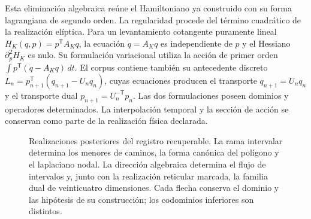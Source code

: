 \documentclass[a4paper,10pt]{article}
\theoremstyle{definition}\newtheorem{definition}[theorem]{Definición}
\theoremstyle{remark}\newtheorem{remark}[theorem]{Observación}
\numberwithin{equation}{section}
\begin{document}
Esta eliminación algebraica reúne el Hamiltoniano ya construido con
su forma lagrangiana de segundo orden. La regularidad procede del
término cuadrático de la realización elíptica. Para un levantamiento
cotangente puramente lineal \(H_K(q,p)=p^{\mathsf T}A_Kq\), la
ecuación \(\dot q=A_Kq\) es independiente de \(p\) y el Hessiano
\(\partial_p^2H_K\) es nulo. Su formulación variacional utiliza la
acción de primer orden \(\int p^{\mathsf T}(\dot q-A_Kq)\,dt\).
El corpus contiene también su antecedente discreto
\(L_n=p_{n+1}^{\mathsf T}(q_{n+1}-U_nq_n)\), cuyas ecuaciones
producen el transporte \(q_{n+1}=U_nq_n\) y el transporte dual
\(p_{n+1}=U_n^{-\mathsf T}p_n\). Las dos formulaciones poseen
dominios y operadores determinados. La interpolación temporal y la
sección de acción se conservan como parte de la realización física
declarada.

\begin{figure}[htbp]
\centering
{}
\caption{Realizaciones posteriores del registro recuperable. La rama
intervalar determina los menores de caminos, la forma canónica del
polígono y el laplaciano nodal. La dirección algebraica determina el
flujo de intervalos y, junto con la realización reticular marcada, la
familia dual de veinticuatro dimensiones. Cada flecha conserva el dominio
y las hipótesis de su construcción; los codominios inferiores son
distintos.}
\label{fig:multimorphology}
\end{figure}
\end{document}

